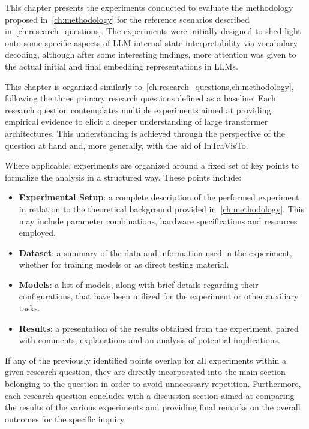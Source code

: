 This chapter presents the experiments conducted to evaluate the methodology proposed in~\cref{ch:methodology} for the reference scenarios described in~\cref{ch:research_questions}.
The experiments were initially designed to shed light onto some specific aspects of LLM internal state interpretability via vocabulary decoding, although after some interesting findings, more attention was given to the actual initial and final embedding representations in LLMs.

This chapter is organized similarly to~\cref{ch:research_questions,ch:methodology}, following the three primary research questions defined as a baseline.
Each research question contemplates multiple experiments aimed at providing empirical evidence to elicit a deeper understanding of large transformer architectures.
This understanding is achieved through the perspective of the question at hand and, more generally, with the aid of InTraVisTo.

Where applicable, experiments are organized around a fixed set of key points to formalize the analysis in a structured way.
These points include:
\begin{itemize}
    \item \textbf{Experimental Setup}: a complete description of the performed experiment in retlation to the theoretical background provided in~\cref{ch:methodology}.
This may include parameter combinations, hardware specifications and resources employed.
    \item \textbf{Dataset}: a summary of the data and information used in the experiment, whether for training models or as direct testing material.
    \item \textbf{Models}: a list of models, along with brief details regarding their configurations, that have been utilized for the experiment or other auxiliary tasks.
    \item \textbf{Results}: a presentation of the results obtained from the experiment,  paired with comments, explanations and an analysis of potential implications.
\end{itemize}
If any of the previously identified points overlap for all experiments within a given research question, they are directly incorporated into the main section belonging to the question in order to avoid unnecessary repetition.
Furthermore, each research question concludes with a discussion section aimed at comparing the results of the various experiments and providing final remarks on the overall outcomes for the specific inquiry.

